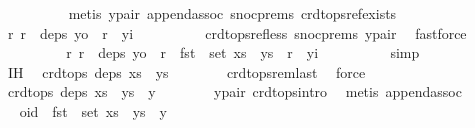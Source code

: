 \begin{isabellebody}
\ \ \ \ \ \ \ \ \isamarkupfalse%
\ {\isacharparenleft}metis\ y{\isacharunderscore}pair\ append{\isacharunderscore}assoc\ snoc{\isachardot}prems{\isacharparenleft}{}{\isacharparenright}\ crdt{\isacharunderscore}ops{\isacharunderscore}ref{\isacharunderscore}exists{\isacharparenright}\isanewline
\ \ \ \ \ \ \isamarkupfalse%
\ \isamarkupfalse%
\ {\isachardoublequoteopen}{\isasymAnd}r{\isachardot}\ r\ {\isasymin}\ deps\ yo\ {\isasymLongrightarrow}\ r\ {\isacharless}\ yi{\isachardoublequoteclose}\isanewline
\ \ \ \ \ \ \ \ \isamarkupfalse%
\ crdt{\isacharunderscore}ops{\isacharunderscore}ref{\isacharunderscore}less\ snoc{\isachardot}prems{\isacharparenleft}{}{\isacharparenright}\ y{\isacharunderscore}pair\ \isamarkupfalse%
\ fastforce\isanewline
\ \ \ \ \ \ \isamarkupfalse%
\ \isamarkupfalse%
\ {\isachardoublequoteopen}{\isasymAnd}r{\isachardot}\ r\ {\isasymin}\ deps\ yo\ {\isasymLongrightarrow}\ r\ {\isasymin}\ fst\ {\isacharbackquote}\ set\ {\isacharparenleft}xs\ {\isacharat}\ ys{\isacharparenright}\ {\isasymand}\ r\ {\isacharless}\ yi{\isachardoublequoteclose}\isanewline
\ \ \ \ \ \ \ \ \isamarkupfalse%
\ simp\isanewline
\ \ \ \ \isamarkupfalse%
\isanewline
\ \ \ \ \isamarkupfalse%
\ \isamarkupfalse%
\ IH\ \isamarkupfalse%
\ {\isachardoublequoteopen}crdt{\isacharunderscore}ops\ deps\ {\isacharparenleft}xs\ {\isacharat}\ ys{\isacharparenright}{\isachardoublequoteclose}\isanewline
\ \ \ \ \ \ \isamarkupfalse%
\ crdt{\isacharunderscore}ops{\isacharunderscore}rem{\isacharunderscore}last\ \isamarkupfalse%
\ force\isanewline
\ \ \ \ \isamarkupfalse%
\ \isamarkupfalse%
\ {\isachardoublequoteopen}crdt{\isacharunderscore}ops\ deps\ {\isacharparenleft}xs\ {\isacharat}\ ys\ {\isacharat}\ {\isacharbrackleft}y{\isacharbrackright}{\isacharparenright}{\isachardoublequoteclose}\isanewline
\ \ \ \ \ \ \isamarkupfalse%
\ y{\isacharunderscore}pair\ crdt{\isacharunderscore}ops{\isacharunderscore}intro\ \isamarkupfalse%
\ {\isacharparenleft}metis\ append{\isachardot}assoc{\isacharparenright}\isanewline
\ \ \isamarkupfalse%
\isanewline
\ \ \isamarkupfalse%
\ \isamarkupfalse%
\ {\isachardoublequoteopen}oid\ {\isasymnotin}\ fst\ {\isacharbackquote}\ set\ {\isacharparenleft}xs\ {\isacharat}\ ys\ {\isacharat}\ {\isacharbrackleft}y{\isacharbrackright}{\isacharparenright}{\isachardoublequoteclose}\isanewline

\end{isabellebody}
